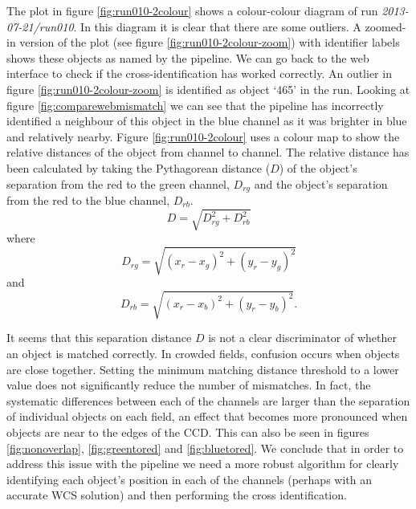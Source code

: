 The plot in figure \ref{fig:run010-2colour} shows a colour-colour diagram of run \emph{2013-07-21/run010}. In this diagram it is clear that there are some outliers. A zoomed-in version of the plot (see figure \ref{fig:run010-2colour-zoom}) with identifier labels shows these objects as named by the pipeline. We can go back to the web interface to check if the cross-identification has worked correctly. An outlier in figure \ref{fig:run010-2colour-zoom} is identified as object `465' in the run. Looking at figure \ref{fig:comparewebmismatch} we can see that the pipeline has incorrectly identified a neighbour of this object in the blue channel as it was brighter in blue and relatively nearby. Figure \ref{fig:run010-2colour} uses a colour map to show the relative distances of the object from channel to channel. The relative distance has been calculated by taking the Pythagorean distance ($D$) of the object's separation from the red to the green channel, $D_{rg}$ and the object's separation from the red to the blue channel, $D_{rb}$.  \begin{equation}D = \sqrt{ D_{rg}^2 + D_{rb}^2}\end{equation}where \begin{equation}D_{rg} = \sqrt{ (x_r - x_g)^2 + (y_r - y_g)^2}\end{equation} and \begin{equation}D_{rb} = \sqrt{ (x_r - x_b)^2 + (y_r - y_b)^2}.\end{equation}

It seems that this separation distance $D$ is not a clear discriminator of whether an object is matched correctly. In crowded fields, confusion occurs when objects are close together. Setting the minimum matching distance threshold to a lower value does not significantly reduce the number of mismatches. In fact, the systematic differences between each of the channels are larger than the separation of individual objects on each field, an effect that becomes more pronounced when objects are near to the edges of the CCD. This can also be seen in figures  \ref{fig:nonoverlap}, \ref{fig:greentored} and \ref{fig:bluetored}.  We conclude that in order to address this issue with the pipeline we need a more robust algorithm for clearly identifying each object's position in each of the channels (perhaps with an accurate WCS solution) and then performing the cross identification. 

